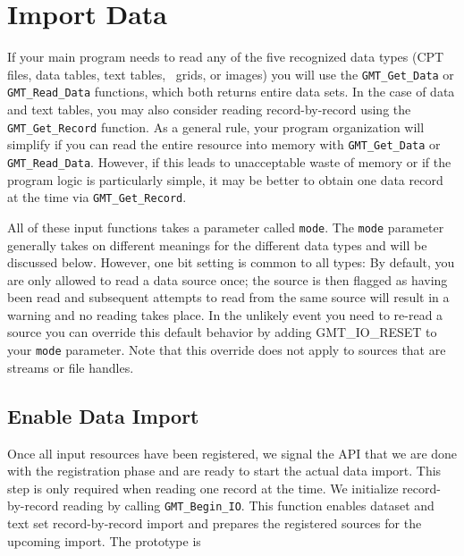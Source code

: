 \documentclass[11pt]{report}
\begin{document}

\section{Import Data}

If your main program needs to read any of the five recognized data types (CPT files, data tables, text tables, \GMT\ grids, or images)
you will use the \texttt{GMT\_Get\_Data} or \texttt{GMT\_Read\_Data} functions, which both returns entire data sets.
In the case of data and text tables, you may also consider reading record-by-record using the \texttt{GMT\_Get\_Record} function.
As a general rule, your program organization will simplify if you can read the entire resource into memory with
\texttt{GMT\_Get\_Data} or \texttt{GMT\_Read\_Data}.  However, if this leads to unacceptable waste of memory or if the program logic is particularly simple,
it may be better to obtain one data record at the time via \texttt{GMT\_Get\_Record}.

All of these input functions takes a parameter called \texttt{mode}.  The \texttt{mode} parameter generally
takes on different meanings for the different data types and will be discussed below.
However, one bit setting is common to all types: By default, you are only allowed to read a
data source once; the source is then flagged as having been read and subsequent attempts to read
from the same source will result in a warning and no reading takes place.  In the unlikely event you need to re-read a
source you can override this default behavior by adding GMT\_IO\_RESET to your \texttt{mode} parameter.
Note that this override does not apply to sources that are streams or file handles.

\subsection{Enable Data Import}

Once all input resources have been registered, we signal the API that we are done with the registration
phase and are ready to start the actual data import.  This step is only required when reading one record at the
time.  We initialize record-by-record reading by calling \texttt{GMT\_Begin\_IO}.  This
function enables dataset and text set record-by-record import and prepares the registered sources for the upcoming import.
The prototype is
\end{document}
